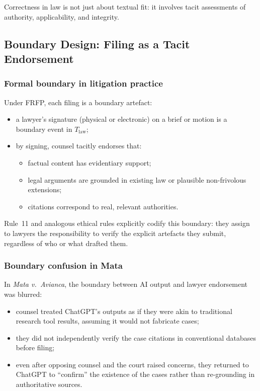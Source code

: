 Correctness in law is not just about textual fit:
it involves tacit assessments of authority, applicability, and integrity.

\subsection{Boundary Design: Filing as a Tacit Endorsement}

\subsubsection*{Formal boundary in litigation practice}

Under FRFP, each filing is a boundary artefact:

\begin{itemize}
  \item a lawyer’s signature (physical or electronic) on a brief or motion is
        a boundary event in \(T_{\mathrm{law}}\);
  \item by signing, counsel tacitly endorses that:
        \begin{itemize}
          \item factual content has evidentiary support;
          \item legal arguments are grounded in existing law or plausible
                non-frivolous extensions;
          \item citations correspond to real, relevant authorities.
        \end{itemize}
\end{itemize}

Rule~11 and analogous ethical rules explicitly codify this boundary:
they assign to lawyers the responsibility to verify the explicit artefacts
they submit, regardless of who or what drafted them.

\subsubsection*{Boundary confusion in Mata}

In \emph{Mata v.\ Avianca}, the boundary between AI output and lawyer
endorsement was blurred:

\begin{itemize}
  \item counsel treated ChatGPT’s outputs as if they were akin to traditional
        research tool results, assuming it would not fabricate cases;
  \item they did not independently verify the case citations in conventional
        databases before filing;
  \item even after opposing counsel and the court raised concerns, they
        returned to ChatGPT to ``confirm'' the existence of the cases rather
        than re-grounding in authoritative sources.
\end{itemize}

